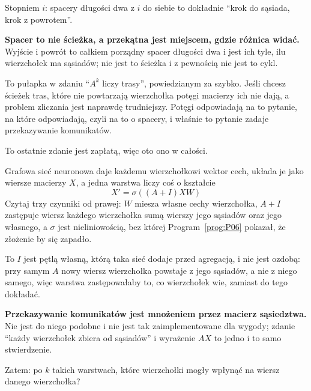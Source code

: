 \begin{fr}
\begin{ansblock}
Stopniem $i$: spacery długości dwa z $i$ do siebie to dokładnie \enquote{krok
do sąsiada, krok z powrotem}.
\end{ansblock}

\begin{trapbox}
\textbf{Spacer to nie ścieżka, a przekątna jest miejscem, gdzie różnica
widać.} Wyjście i powrót to całkiem porządny spacer długości dwa i jest ich
tyle, ilu wierzchołek ma sąsiadów; nie jest to ścieżka i z pewnością nie jest
to cykl.

To pułapka w zdaniu \enquote{$A^{k}$ liczy trasy}, powiedzianym za szybko.
Jeśli chcesz ścieżek \dash{} tras, które nie powtarzają wierzchołka \dash{}
potęgi macierzy ich nie dają, a problem zliczania jest naprawdę trudniejszy.
Potęgi odpowiadają na to pytanie, na które odpowiadają, czyli na to o spacery,
i właśnie to pytanie zadaje przekazywanie komunikatów.
\end{trapbox}

\end{fr}

\begin{fr}
To ostatnie zdanie jest zapłatą, więc oto ono w całości.

Grafowa sieć neuronowa daje każdemu wierzchołkowi wektor cech, układa je jako
wiersze macierzy $X$, a jedna warstwa liczy coś o kształcie
\[ X' = \sigma((A + I)XW) \]
Czytaj trzy czynniki od prawej: $W$ miesza własne cechy wierzchołka, $A + I$
zastępuje wiersz każdego wierzchołka sumą wierszy jego sąsiadów oraz jego
własnego, a $\sigma$ jest nieliniowością, bez której Program~\ref{prog:P06}
pokazał, że złożenie by się zapadło.

To $I$ jest pętlą własną, którą taka sieć dodaje przed agregacją, i nie jest
ozdobą: przy samym $A$ nowy wiersz wierzchołka powstaje z jego sąsiadów, a nie
z niego samego, więc warstwa zastępowałaby to, co wierzchołek wie, zamiast do
tego dokładać.

\textbf{Przekazywanie komunikatów jest mnożeniem przez macierz sąsiedztwa.}
Nie jest do niego podobne i nie jest tak zaimplementowane dla wygody; zdanie
\enquote{każdy wierzchołek zbiera od sąsiadów} i wyrażenie $AX$ to jedno i to
samo stwierdzenie.

Zatem: po $k$ takich warstwach, które wierzchołki mogły wpłynąć na wiersz
danego wierzchołka?
\dotline
\nextframe
\end{fr}

